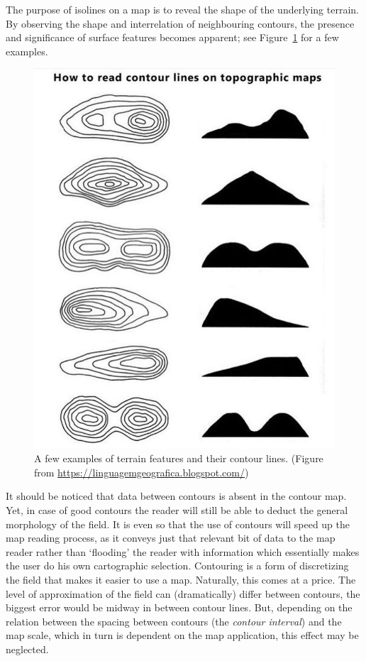 The purpose of isolines on a map is to reveal the shape of the underlying terrain. 
By observing the shape and interrelation of neighbouring contours, the presence and significance of surface features becomes apparent; see Figure~\ref{fig:contours} for a few examples.
\begin{figure}
  \centering
  \includegraphics[width=0.6\linewidth]{figs/contours.jpg}
  \caption{A few examples of terrain features and their contour lines. (Figure from \url{https://linguagemgeografica.blogspot.com/})}
\label{fig:contours}
\end{figure}
It should be noticed that data between contours is absent in the contour map. 
Yet, in case of good contours the reader will still be able to deduct the general morphology of the field. 
It is even so that the use of contours will speed up the map reading process, as it conveys just that relevant bit of data to the map reader rather than `flooding' the reader with information which essentially makes the user do his own cartographic selection. 
Contouring is a form of discretizing the field that makes it easier to use a map. 
Naturally, this comes at a price. 
The level of approximation of the field can (dramatically) differ between contours, the biggest error would be midway in between contour lines. 
But, depending on the relation between the spacing between contours (the \emph{contour interval}) and the map scale, which in turn is dependent on the map application, this effect may be neglected.


%

